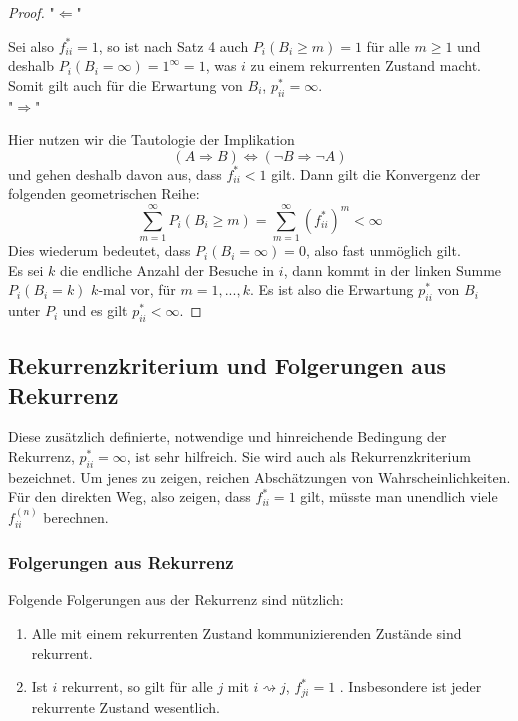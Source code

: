 \documentclass[a4paper]{article}
\begin{document}
\begin{proof}
	"$\Leftarrow$"

	Sei also $f_{ii} ^{*} =1$, so ist nach Satz 4 auch 
	$P_i \left(
		B_i \geq m
	\right) = 1$
	für alle $m \geq 1$ und deshalb 
	$P_i \left(
		B_i = \infty
	\right) = 1 ^{\infty} = 1$,
	was $i$ zu einem rekurrenten Zustand macht. 
	Somit gilt auch für die Erwartung von $B_i$, $p_{ii} ^{*} = \infty$.
	\\

	"$\Rightarrow$"

	Hier nutzen wir die Tautologie der Implikation 
	\[
	\left(
		A \Rightarrow B
	\right) \Leftrightarrow 
	\left(
		\neg B \Rightarrow \neg A
	\right) 
	\] 
	und gehen deshalb
	davon aus, dass $f_{ii} ^{*} < 1$ gilt. Dann gilt die Konvergenz der folgenden geometrischen Reihe:
	\[
	\sum_{m=1}^{\infty} P_i \left(
		B_i \geq m
	\right) = \sum_{m=1}^{\infty} \left(
		f_{ii} ^{*}
	\right) ^{m} < \infty
	\] 
	Dies wiederum bedeutet, dass $P_i (B_i = \infty) = 0$, also fast unmöglich gilt.
	\\

	Es sei $k$ die endliche Anzahl der Besuche in $i$, dann kommt in der linken Summe $P_i \left(
		B_i = k
	\right) $ $k$-mal
	vor, für $m=1,...,k$. Es ist also die Erwartung $p_{ii} ^{*}$ von $B_i$ unter $P_i$ und es gilt $p_{ii} ^{*} < \infty$.
\end{proof}

\subsection{Rekurrenzkriterium und Folgerungen aus Rekurrenz}
Diese zusätzlich definierte, notwendige und hinreichende Bedingung der Rekurrenz, $p_{ii} ^{*} = \infty$, ist
sehr hilfreich. Sie wird auch als Rekurrenzkriterium bezeichnet. 
Um jenes zu zeigen, reichen
Abschätzungen von Wahrscheinlichkeiten. 
\\

Für den direkten Weg, also zeigen, dass $f_{ii} ^{*} = 1$ gilt,
müsste man unendlich viele $f_{ii} ^{(n)}$ berechnen.

\subsubsection{Folgerungen aus Rekurrenz}
Folgende Folgerungen aus der Rekurrenz sind nützlich:

\begin{enumerate}
	\item Alle mit einem rekurrenten Zustand kommunizierenden Zustände sind rekurrent.
	\item Ist $i$ rekurrent, so gilt für alle $j$ mit 
		$i \rightsquigarrow j$, $f_{ji} ^{*} = 1$
		. Insbesondere ist jeder rekurrente Zustand wesentlich.
\end{enumerate}
\end{document}
